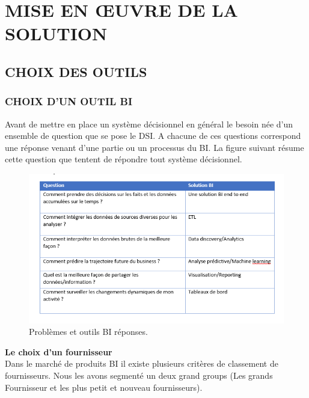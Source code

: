 \chapter{MISE EN ŒUVRE DE LA SOLUTION}
\section{CHOIX DES OUTILS}
\subsection{CHOIX D'UN OUTIL BI}
Avant de mettre en place un système décisionnel en général le besoin née d’un ensemble de question que se pose le DSI. A chacune de ces questions correspond une réponse venant d’une partie ou un processus du BI. La figure suivant résume cette question que tentent de répondre tout système décisionnel.

\begin{figure}[!htbp]
	\begin{center}
		\includegraphics[scale=0.95]{images/tab_question_bi.png}
		\caption{Problèmes et outils BI réponses.}
		\label{use_bi_tools}
	\end{center}
\end{figure}

\textbf{Le choix d’un fournisseur}\\

Dans le marché de produits BI il existe  plusieurs critères de classement de fournisseurs. Nous les avons segmenté un deux grand groups (Les grands Fournisseur et les plus petit et nouveau fournisseurs).

